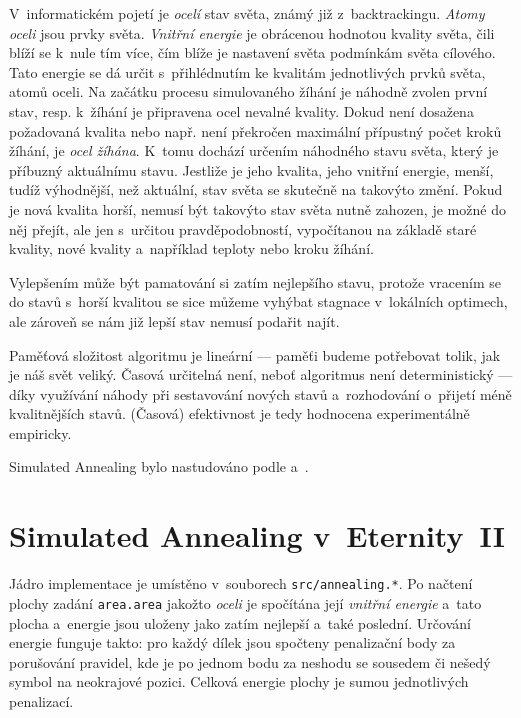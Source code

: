 \documentclass[11pt, titlepage]{report}
\begin{document}
V~informatickém pojetí je \emph{ocelí} stav světa, známý již z~backtrackingu. \emph{Atomy oceli} jsou prvky světa. \emph{Vnitřní energie} je obrácenou hodnotou kvality světa, čili blíží se k~nule tím více, čím blíže je nastavení světa podmínkám světa cílového. Tato energie se dá určit s~přihlédnutím ke kvalitám jednotlivých prvků světa, atomů oceli. Na začátku procesu simulovaného žíhání je náhodně zvolen první stav, resp. k~žíhání je připravena ocel nevalné kvality. Dokud není dosažena požadovaná kvalita nebo např. není překročen maximální přípustný počet kroků žíhání, je \emph{ocel žíhána}. K~tomu dochází určením náhodného stavu světa, který je příbuzný aktuálnímu stavu. Jestliže je jeho kvalita, jeho vnitřní energie, menší, tudíž výhodnější, než aktuální, stav světa se skutečně na takovýto změní. Pokud je nová kvalita horší, nemusí být takovýto stav světa nutně zahozen, je možné do něj přejít, ale jen s~určitou pravděpodobností, vypočítanou na základě staré kvality, nové kvality a~například teploty nebo kroku žíhání.

Vylepšením může být pamatování si zatím nejlepšího stavu, protože vracením se do stavů s~horší kvalitou se sice můžeme vyhýbat stagnace v~lokálních optimech, ale zároveň se nám již lepší stav nemusí podařit najít.

Paměťová složitost algoritmu je lineární --- paměťi budeme potřebovat tolik, jak je náš svět veliký. Časová určitelná není, neboť algoritmus není deterministický --- díky využívání náhody při sestavování nových stavů a~rozhodování o~přijetí méně kvalitnějších stavů. (Časová) efektivnost je tedy hodnocena experimentálně empiricky.

Simulated Annealing bylo nastudováno podle \cite{sa-wiki} a~\cite{sa-papers}.

\section{Simulated Annealing v~Eternity~II}
\label{sec:sa-et}

Jádro implementace je umístěno v~souborech \texttt{src/annealing.*}. Po načtení plochy zadání \texttt{area.area} jakožto \emph{oceli} je spočítána její \emph{vnitřní energie} a~tato plocha a~energie jsou uloženy jako zatím nejlepší a~také poslední. Určování energie funguje takto: pro každý dílek jsou spočteny penalizační body za porušování pravidel, kde je po jednom bodu za neshodu se sousedem či nešedý symbol na neokrajové pozici. Celková energie plochy je sumou jednotlivých penalizací.
\end{document}
